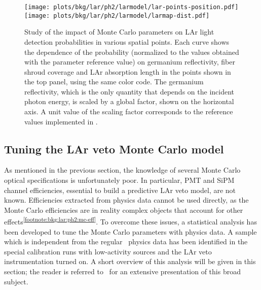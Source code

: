 \begin{figure}
  \centering
  \texttt{[image: plots/bkg/lar/ph2/larmodel/lar-points-position.pdf]}
  \texttt{[image: plots/bkg/lar/ph2/larmodel/larmap-dist.pdf]}
  \caption{%
    Study of the impact of Monte Carlo parameters on LAr light detection probabilities in
    various spatial points. Each curve shows the dependence of the probability (normalized
    to the values obtained with the parameter reference value) on germanium reflectivity,
    fiber shroud coverage and LAr absorption length in the points shown in the top panel,
    using the same color code. The germanium reflectivity, which is the only quantity that
    depends on the incident photon energy, is scaled by a global factor, shown on the
    horizontal axis. A unit value of the scaling factor corresponds to the reference
    values implemented in \mage.
  }\label{fig:bkg:lar:ph2:larmap:dist}
\end{figure}

\subsection{Tuning the LAr veto Monte Carlo model}%
\label{sec:bkg:lar:ph2:pcalib}

As mentioned in the previous section, the knowledge of several Monte Carlo optical
specifications is unfortunately poor. In particular, PMT and SiPM channel efficiencies,
essential to build a predictive LAr veto model, are not known. Efficiencies extracted from
physics data cannot be used directly, as the Monte Carlo efficiencies are in reality
complex objects that account for other
effects\textsuperscript{\ref{footnote:bkg:lar:ph2:mc-eff}}. To overcome these issues, a
statistical analysis has been developed to tune the Monte Carlo parameters with physics
data. A sample which is independent from the regular \gerda\ physics data has been
identified in the special calibration runs with low-activity sources and the LAr veto
instrumentation turned on. A short overview of this analysis will be given in this
section; the reader is referred to~\cite{Wiesinger2021} for an extensive presentation of
this broad subject.

